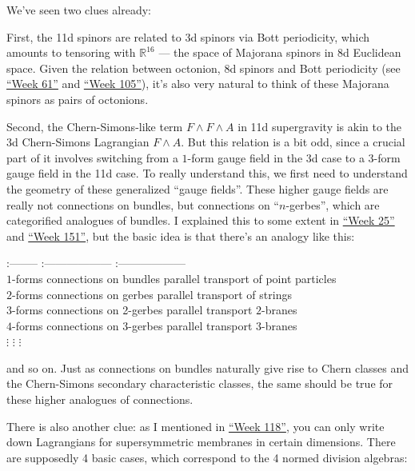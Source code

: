 \documentclass{article}
\begin{document}
We've seen two clues already:

First, the 11d spinors are related to 3d spinors via Bott periodicity,
which amounts to tensoring with \(\mathbb{R}^{16}\) --- the space of
Majorana spinors in 8d Euclidean space. Given the relation between
octonion, 8d spinors and Bott periodicity (see
\protect\hyperlink{week61}{``Week 61''} and
\protect\hyperlink{week105}{``Week 105''}), it's also very natural to
think of these Majorana spinors as pairs of octonions.

Second, the Chern-Simons-like term \(F\wedge F\wedge A\) in 11d
supergravity is akin to the 3d Chern-Simons Lagrangian \(F\wedge A\).
But this relation is a bit odd, since a crucial part of it involves
switching from a \(1\)-form gauge field in the 3d case to a \(3\)-form
gauge field in the 11d case. To really understand this, we first need to
understand the geometry of these generalized ``gauge fields''. These
higher gauge fields are really not connections on bundles, but
connections on ``\(n\)-gerbes'', which are categorified analogues of
bundles. I explained this to some extent in
\protect\hyperlink{week25}{``Week 25''} and
\protect\hyperlink{week151}{``Week 151''}, but the basic idea is that
there's an analogy like this:

:-------- \textbar{} :------------------ \textbar{} :------------------
\textbar{}\\
\(1\)-forms \textbar{} connections on bundles \textbar{} parallel
transport of point particles \textbar{}\\
\(2\)-forms \textbar{} connections on gerbes \textbar{} parallel
transport of strings \textbar{}\\
\(3\)-forms \textbar{} connections on 2-gerbes \textbar{} parallel
transport \(2\)-branes \textbar{}\\
\(4\)-forms \textbar{} connections on 3-gerbes \textbar{} parallel
transport \(3\)-branes \textbar{}\\
\(\vdots\) \textbar{} \(\vdots\) \textbar{} \(\vdots\) \textbar{}

and so on. Just as connections on bundles naturally give rise to Chern
classes and the Chern-Simons secondary characteristic classes, the same
should be true for these higher analogues of connections.

There is also another clue: as I mentioned in
\protect\hyperlink{week118}{``Week 118''}, you can only write down
Lagrangians for supersymmetric membranes in certain dimensions. There
are supposedly 4 basic cases, which correspond to the 4 normed division
algebras:
\end{document}
